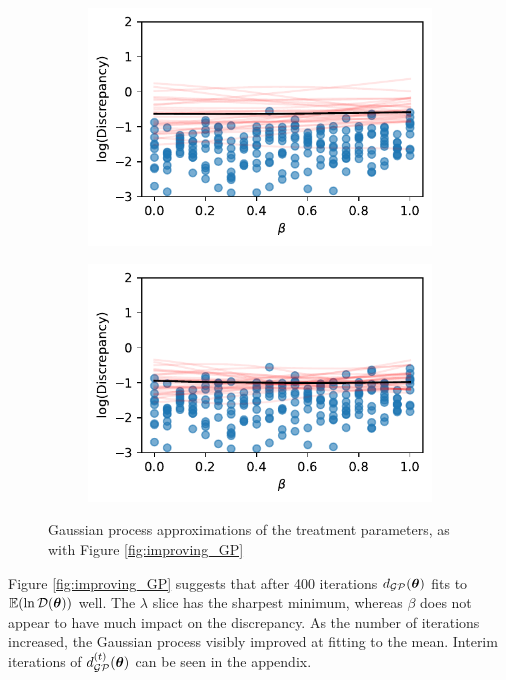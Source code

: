 \begin{figure}[htbp]
\begin{subfigure}[b]{0.5\textwidth}
        \includegraphics[width=\textwidth]{
            ../champagne_GP_images/initial_beta_slice_log_discrep.pdf
        }
    \end{subfigure}%
    \hfill%
    \begin{subfigure}[b]{0.5\textwidth}
        \centering
        \includegraphics[width=\textwidth]{
            ../champagne_GP_images/beta_slice_400_bolfi_updates_log_discrep.pdf
        }
    \end{subfigure}
    \caption{
        Gaussian process approximations of the treatment parameters, as with
        Figure \ref{fig:improving_GP}
    }
    \label{fig:treatment_GP_fig}
\end{figure}

Figure \ref{fig:improving_GP} suggests that after 400 iterations
$d_{\mathcal{GP}}(\bm{\theta})$ fits to $\operatorname{\mathbb{E}}(\ln\mathcal{D}(\bm{\theta}))$ well.
The $\lambda$ slice has the sharpest minimum, whereas $\beta$
does not appear to have much impact on the discrepancy.
As the number of iterations increased, the Gaussian process visibly
improved at fitting to the mean. Interim iterations of $d^{(t)}_{\mathcal{GP}}(\bm{\theta})$
can be seen in the appendix.

